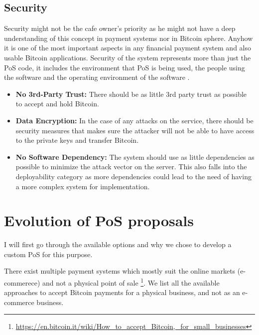 \subsection{Security} Security might not be the cafe owner's priority as he might not have a deep understanding of this concept in payment systems nor in Bitcoin sphere. Anyhow it is one of the most important aspects in any financial payment system and also usable Bitcoin applications. Security of the system represents more than just the PoS code, it includes the environment that PoS is being used, the people using the software and the operating environment of the software \cite{securityreq}.
\begin{itemize}

\item \textbf{No 3rd-Party Trust: }There should be as little 3rd party trust as possible to accept and hold Bitcoin.

\item \textbf{Data Encryption: }In the case of any attacks on the service, there should be security measures that makes sure the attacker will not be able to have access to the private keys and transfer Bitcoin.

\item \textbf{No Software Dependency: }The system should use as little dependencies as possible to minimize the attack vector on the server. This also falls into the deployability category as more dependencies could lead to the need of having a more complex system for implementation. %

\end{itemize}

\section{Evolution of PoS proposals}
I will first go through the available options and why we chose to develop a custom PoS for this purpose.

There exist multiple payment systems which mostly suit the online markets (\eg e-commerece) and not a physical point of sale \footnote{\url{https://en.bitcoin.it/wiki/How_to_accept_Bitcoin,_for_small_businesses}}. We list all the available approaches to accept Bitcoin payments for a physical business, and not as an e-commerce business.

